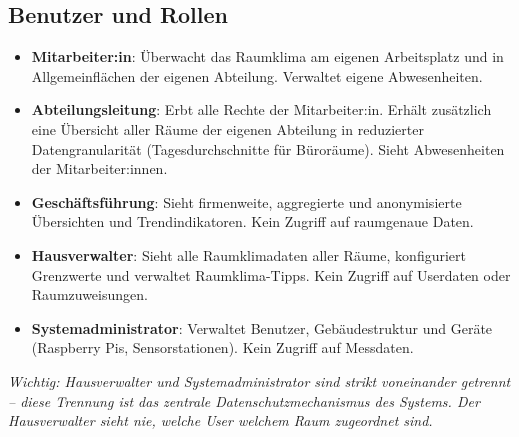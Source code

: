 \documentclass[12pt,a4paper]{article}
\begin{document}
\subsection{Benutzer und Rollen}
\begin{itemize}
	\item \textbf{Mitarbeiter:in}: Überwacht das Raumklima am eigenen Arbeitsplatz und in Allgemeinflächen der eigenen Abteilung. Verwaltet eigene Abwesenheiten.
	\item \textbf{Abteilungsleitung}: Erbt alle Rechte der Mitarbeiter:in. Erhält zusätzlich eine Übersicht aller Räume der eigenen Abteilung in reduzierter Datengranularität (Tagesdurchschnitte für Büroräume). Sieht Abwesenheiten der Mitarbeiter:innen.
	\item \textbf{Geschäftsführung}: Sieht firmenweite, aggregierte und anonymisierte Übersichten und Trendindikatoren. Kein Zugriff auf raumgenaue Daten.
	\item \textbf{Hausverwalter}: Sieht alle Raumklimadaten aller Räume, konfiguriert Grenzwerte und verwaltet Raumklima-Tipps. Kein Zugriff auf Userdaten oder Raumzuweisungen.
	\item \textbf{Systemadministrator}: Verwaltet Benutzer, Gebäudestruktur und Geräte (Raspberry Pis, Sensorstationen). Kein Zugriff auf Messdaten.
\end{itemize}

\textit{Wichtig: Hausverwalter und Systemadministrator sind strikt voneinander getrennt -- diese Trennung ist das zentrale Datenschutzmechanismus des Systems. Der Hausverwalter sieht nie, welche User welchem Raum zugeordnet sind.}
\end{document}
